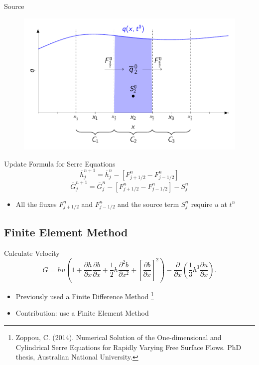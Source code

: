 \documentclass[]{beamer}
\begin{document}
\begin{frame}{Source}
	\begin{figure}
		\includegraphics[width=\textwidth]{./Pics/FVMpicture/TotalFluxInOutSource.pdf}
	\end{figure}
\end{frame}


\begin{frame}{Update Formula for Serre Equations}
	\begin{equation*}
	\overline{h}_j^{n+1} = \overline{h}_j^n -  \left[F_{j + 1/2}^n - F_{j - 1/2}^n \right]
	\end{equation*}
	\begin{equation*}
	\overline{G}_j^{n+1}  = \overline{G}_j^n -  \left[F_{j + 1/2}^n - F_{j - 1/2}^n \right] -  S^n_j
	\end{equation*}
	\pause
	\begin{itemize}
		\item All the fluxes $F^n_{j + 1/2}$ and $F^n_{j - 1/2}$ and the source term $ S^n_j$ require $u$ at $t^n$
	\end{itemize}
	
\end{frame}

\subsection{Finite Element Method}
\begin{frame}{Calculate Velocity}
		\[ G =  h {u} \left(1 + \frac{\partial h}{\partial x}\frac{\partial b}{\partial x} + \frac{1}{2}h\frac{\partial^2 b}{\partial x^2} + \left[\frac{\partial b}{\partial x}\right]^2 \right) - \frac{\partial}{\partial x}\left(\frac{1}{3}h^3  \frac{\partial {u}}{\partial x}\right).\]
		\pause
		\begin{itemize}
			\item Previously used a Finite Difference Method \footnote{Zoppou, C. (2014).
				Numerical Solution of the One-dimensional and Cylindrical
				Serre Equations for Rapidly Varying Free Surface Flows. PhD thesis, Australian National University.}
			\item Contribution: use a Finite Element Method
		\end{itemize}
\end{frame}
\end{document}
